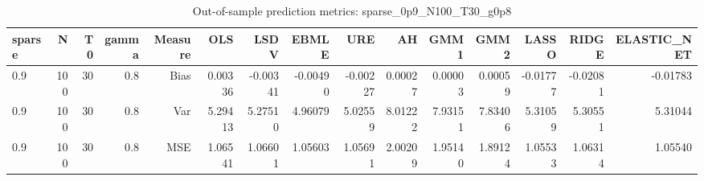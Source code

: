 \begin{table}[!htbp]\centering
\caption{Out-of-sample prediction metrics: sparse_0p9_N100_T30_g0p8}
\label{tab:table3_sparse_0p9_N100_T30_g0p8}
\begin{tabular}{lrrrrrrrrrrrrrr}
\hline
sparse & N & T0 & gamma & Measure & OLS & LSDV & EBMLE & URE & AH & GMM1 & GMM2 & LASSO & RIDGE & ELASTIC_NET \\
\hline
0.9 & 100 & 30 & 0.8 & Bias & 0.00336 & -0.00341 & -0.00490 & -0.00227 & 0.00027 & 0.00003 & 0.00059 & -0.01777 & -0.02081 & -0.01783 \\
0.9 & 100 & 30 & 0.8 & Var & 5.29413 & 5.27510 & 4.96079 & 5.02559 & 8.01222 & 7.93151 & 7.83406 & 5.31059 & 5.30551 & 5.31044 \\
0.9 & 100 & 30 & 0.8 & MSE & 1.06541 & 1.06601 & 1.05603 & 1.05691 & 2.00209 & 1.95140 & 1.89124 & 1.05533 & 1.06314 & 1.05540 \\
\hline
\end{tabular}
\end{table}

